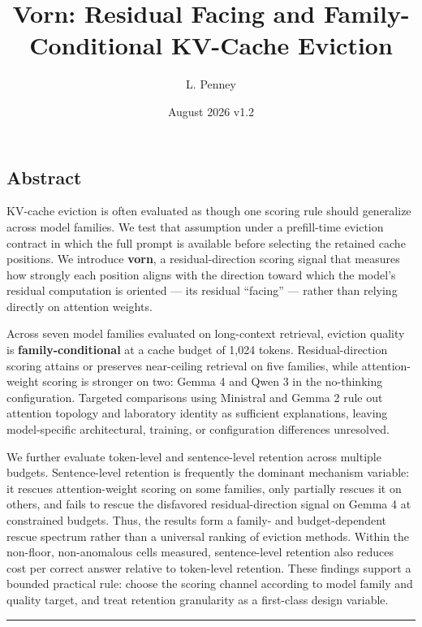 \documentclass[
]{article}
\title{Vorn: Residual Facing and Family-Conditional KV-Cache Eviction}
\author{L. Penney}
\date{August 2026 \textperiodcentered{} v1.2}
\begin{document}
\sloppy
\maketitle

\subsection{Abstract}\label{abstract}

KV-cache eviction is often evaluated as though one scoring rule should
generalize across model families. We test that assumption under a
prefill-time eviction contract in which the full prompt is available
before selecting the retained cache positions. We introduce
\textbf{vorn}, a residual-direction scoring signal that measures how
strongly each position aligns with the direction toward which the
model's residual computation is oriented --- its residual ``facing'' ---
rather than relying directly on attention weights.

Across seven model families evaluated on long-context retrieval,
eviction quality is \textbf{family-conditional} at a cache budget of
1,024 tokens. Residual-direction scoring attains or preserves
near-ceiling retrieval on five families, while attention-weight scoring
is stronger on two: Gemma 4 and Qwen 3 in the no-thinking
configuration. Targeted comparisons using Ministral and Gemma 2 rule
out attention topology and laboratory identity as sufficient
explanations, leaving model-specific architectural, training, or
configuration differences unresolved.

We further evaluate token-level and sentence-level retention across
multiple budgets. Sentence-level retention is frequently the dominant
mechanism variable: it rescues attention-weight scoring on some
families, only partially rescues it on others, and fails to rescue the
disfavored residual-direction signal on Gemma 4 at constrained budgets.
Thus, the results form a family- and budget-dependent rescue spectrum
rather than a universal ranking of eviction methods. Within the
non-floor, non-anomalous cells measured, sentence-level retention also
reduces cost per correct answer relative to token-level retention.
These findings support a bounded practical rule: choose the scoring
channel according to model family and quality target, and treat
retention granularity as a first-class design variable.

\begin{center}\rule{0.5\linewidth}{0.5pt}\end{center}
\end{document}

